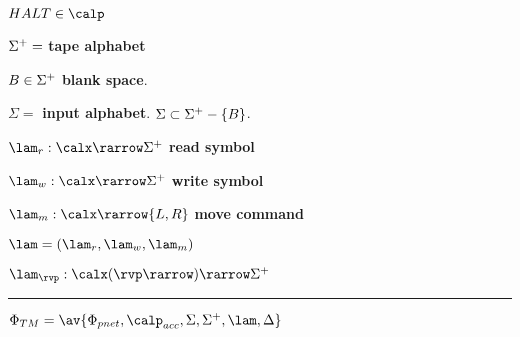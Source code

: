 $HALT\in \calp$

$\Sigma^+ =$ {\bf tape alphabet}

$B\in \Sigma^+$ {\bf blank space}.

$\Sigma=$ {\bf input alphabet}. $\Sigma\subset\Sigma^+-\{B\}$. 

$\lam_{r}:\calx\rarrow \TA$ {\bf read symbol}

$\lam_{w}:\calx\rarrow \TA$ {\bf write symbol}

$\lam_{m}:\calx\rarrow \{L,R\}$ {\bf move command}

$\lam = (\lam_r, \lam_w, \lam_m)$

$\lam_\rvp: \calx(\rvp\rarrow)\rarrow \TA$

\hrule
$\Phi_{TM}=\av{\Phi_{pnet},\calp_{acc}, \Sigma,
\Sigma^+, \lam, \Delta}$



